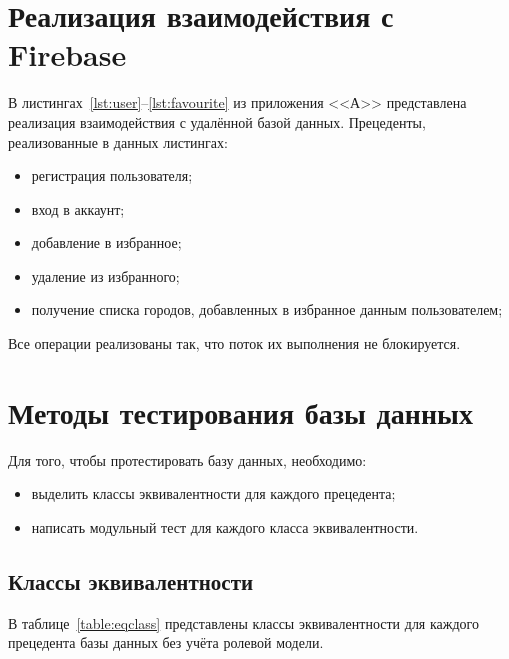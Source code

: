 \section{Реализация взаимодействия с Firebase}
В листингах~\ref{lst:user}--\ref{lst:favourite} из приложения <<А>> представлена реализация взаимодействия с удалённой базой данных.
Прецеденты, реализованные в данных листингах:
\begin{itemize}
    \item регистрация пользователя;
    \item вход в аккаунт;
    \item добавление в избранное;
    \item удаление из избранного;
    \item получение списка городов, добавленных в избранное данным пользователем;
\end{itemize}
Все операции реализованы так, что поток их выполнения не блокируется.

\section{Методы тестирования базы данных}
Для того, чтобы протестировать базу данных, необходимо:
\begin{itemize}
    \item выделить классы эквивалентности для каждого прецедента;
    \item написать модульный тест для каждого класса эквивалентности.
\end{itemize}

\subsection{Классы эквивалентности}
В таблице~\ref{table:eqclass} представлены классы эквивалентности для каждого прецедента базы данных без учёта ролевой модели.

